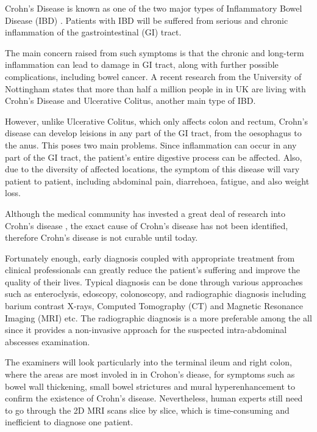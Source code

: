 Crohn's Disease \cite{baumgart2012crohn,crohnsNHS} is known as one of the two major types of Inflammatory Bowel Disease (IBD) \cite{IBDCDC}. Patients with IBD will be suffered from serious and chronic inflammation of the gastrointestinal (GI) tract. \medskip

\noindent The main concern raised from such symptoms is that the chronic and long-term inflammation can lead to damage in GI tract, along with further possible complications, including bowel cancer. A recent research from the University of Nottingham \cite{UoNResearch} states that more than half a million people in in UK are living with Crohn's Disease and Ulcerative Colitus, another main type of IBD. \medskip

\noindent However, unlike Ulcerative Colitus, which only affects colon and rectum, Crohn's disease can develop leisions in any part of the GI tract, from the oesophagus to the anus. This poses two main problems. Since inflammation can occur in any part of the GI tract, the patient's entire digestive process can be affected. Also, due to the diversity of affected locations, the symptom of this disease will vary patient to patient, including abdominal pain, diarrehoea, fatigue, and also weight loss. \medskip

\noindent Although the medical community has invested a great deal of research into Crohn's disease \cite{hoarau2016bacteriome,feuerstein2021aga}, the exact cause of Crohn's disease has not been identified, therefore Crohn's disease is not curable until today. \medskip

\noindent Fortunately enough, early diagnosis coupled with appropriate treatment from clinical professionals can greatly reduce the patient's suffering and improve the quality of their lives. Typical diagnosis can be done through various approaches such as enteroclysis, edoscopy, colonoscopy, and radiographic diagnosis including barium contrast X-rays, Computed Tomography (CT) and Magnetic Resonance Imaging (MRI) etc. The radiographic diagnosis is a more preferable among the all since it provides a non-invasive approach for the suspected intra-abdominal abscesses examination. \medskip

\noindent The examiners will look particularly into the terminal ileum and right colon, where the areas are most involed in in Crohon's diease, for symptoms such as bowel wall thickening, small bowel strictures and mural hyperenhancement \cite{bruining2018consensus} to confirm the existence of Crohn's disease. Nevertheless, human experts still need to go through the 2D MRI scans slice by slice, which is time-consuming and inefficient to diagnose one patient. \medskip


